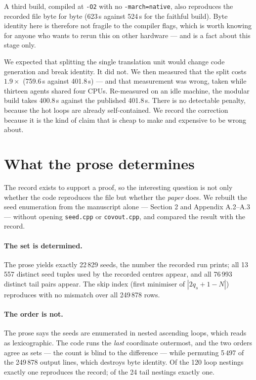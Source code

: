 \documentclass[11pt,a4paper]{article}
\newcommand{\code}[1]{\texttt{\small #1}}
\begin{document}
A third build, compiled at \code{-O2} with no \code{-march=native}, also reproduces the recorded file
byte for byte (623\,s against 524\,s for the faithful build). Byte identity here is therefore not
fragile to the compiler flags, which is worth knowing for anyone who wants to rerun this on other
hardware --- and is a fact about this stage only.

We expected that splitting the single translation unit would change code generation and break
identity. It did not. We then measured that the split costs $1.9\times$ (759.6\,s against
401.8\,s) --- and that measurement was wrong, taken while thirteen agents shared four CPUs. Re-measured
on an idle machine, the modular build takes 400.8\,s against the published 401.8\,s. There is no
detectable penalty, because the hot loops are already self-contained. We record the correction because
it is the kind of claim that is cheap to make and expensive to be wrong about.

\section{What the prose determines}\label{sec:cleanroom}

The record exists to support a proof, so the interesting question is not only whether the code
reproduces the file but whether the \emph{paper} does. We rebuilt the seed enumeration from the
manuscript alone --- Section 2 and Appendix A.2--A.3 --- without opening \code{seed.cpp} or
\code{covout.cpp}, and compared the result with the record.

\paragraph{The set is determined.} The prose yields exactly 22\,829 seeds, the number the recorded run
prints; all 13\,557 distinct seed tuples used by the recorded centres appear, and all 76\,993 distinct
tail pairs appear. The skip index (first minimiser of $|2q_s+1-N|$) reproduces with no mismatch over
all 249\,878 rows.

\paragraph{The order is not.} The prose says the seeds are enumerated in nested ascending loops, which
reads as lexicographic. The code runs the \emph{last} coordinate outermost, and the two orders agree
as sets --- the count is blind to the difference --- while permuting 5\,497 of the 249\,878 output
lines, which destroys byte identity. Of the 120 loop nestings exactly one reproduces the record; of
the 24 tail nestings exactly one.
\end{document}
